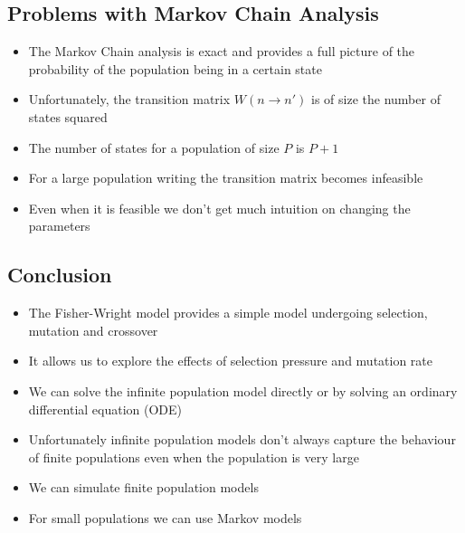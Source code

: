 
\begin{slide}
\section{Problems with Markov Chain Analysis}

\begin{PauseHighLight}
  \begin{itemize}
  \item The Markov Chain analysis is exact and provides a full picture
    of the probability of the population being in a certain state\pause
  \item Unfortunately, the transition matrix $W(n\rightarrow n')$
    is of size the number of states squared\pause
  \item The number of states for a population of size $P$ is $P+1$\pause
  \item For a large population writing the transition matrix becomes
    infeasible\pause
  \item Even when it is feasible we don't get much intuition on changing
    the parameters\pause
  \end{itemize}
\end{PauseHighLight}

\end{slide}



\begin{slide}
\section[-2]{Conclusion}

\begin{PauseHighLight}
  \begin{itemize}
  \item The Fisher-Wright model provides a simple model undergoing
    selection, mutation and crossover\pause
  \item It allows us to explore the effects of selection pressure and
    mutation rate\pause
  \item We can solve the infinite population model directly or by
    solving an ordinary differential equation (ODE)\pause
  \item Unfortunately infinite population models don't always capture
    the behaviour of finite populations even when the population is very
    large\pause
  \item We can simulate finite population models\pause
  \item For small populations we can use Markov models\pause
  \end{itemize}
\end{PauseHighLight}

\end{slide}

